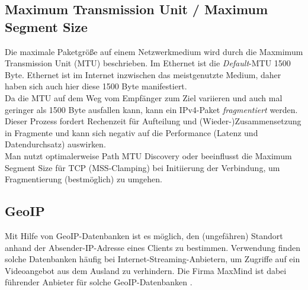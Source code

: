 \subsection{Maximum Transmission Unit / Maximum Segment Size}\label{mtumss}
Die maximale Paketgröße auf einem Netzwerkmedium wird durch die Maxmimum Transmission Unit (MTU) beschrieben. Im Ethernet ist die \textit{Default}-MTU 1500 Byte.\cite[S.86]{Fall2011} Ethernet ist im Internet inzwischen das meistgenutzte Medium, daher haben sich auch hier diese 1500 Byte manifestiert.\\
Da die MTU auf dem Weg vom Empfänger zum Ziel variieren und auch mal geringer als 1500 Byte ausfallen kann, kann ein IPv4-Paket \textit{fragmentiert} werden. Dieser Prozess fordert Rechenzeit für Aufteilung und (Wieder-)Zusammensetzung in Fragmente und kann sich negativ auf die Performance (Latenz und Datendurchsatz) auswirken.\\
Man nutzt optimalerweise Path MTU Discovery oder beeinflusst die Maximum Segment Size für \gls{TCP} (\glqq \gls{MSS}-Clamping\grqq{}) bei Initiierung der Verbindung, um Fragmentierung (bestmöglich) zu umgehen.

\subsection{GeoIP}
Mit Hilfe von \gls{GeoIP}-Datenbanken ist es möglich, den (ungefähren) Standort anhand der Absender-IP-Adresse eines \gls{Client}s zu bestimmen. Verwendung finden solche Datenbanken häufig bei Internet-Streaming-Anbietern, um Zugriffe auf ein Videoangebot aus dem Ausland zu verhindern. Die Firma MaxMind ist dabei führender Anbieter für solche \gls{GeoIP}-Datenbanken \cite{maxmind2021geoip}.

